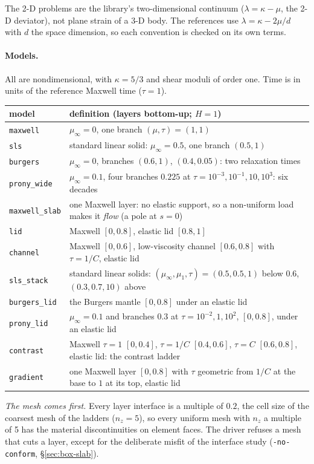 \documentclass[11pt]{article}
\numberwithin{equation}{section}
\newcommand{\code}[1]{\texttt{#1}}
\begin{document}
The 2-D problems are the library's two-dimensional continuum
($\lambda=\kappa-\mu$, the 2-D deviator), not plane strain of a 3-D body.
The references use $\lambda=\kappa-2\mu/d$ with $d$ the space dimension,
so each convention is checked on its own terms.

\paragraph{Models.}
All are nondimensional, with $\kappa=5/3$ and shear moduli of order one.
Time is in units of the reference Maxwell time ($\tau=1$).
\begin{center}
\small
\begin{tabular}{@{}lP{11.6cm}@{}}
\toprule
model & definition (layers bottom-up; $H=1$) \\
\midrule
\code{maxwell} & $\mu_\infty=0$, one branch $(\mu,\tau)=(1,1)$ \\
\code{sls} & standard linear solid: $\mu_\infty=0.5$, one branch $(0.5,1)$ \\
\code{burgers} & $\mu_\infty=0$, branches $(0.6,1)$, $(0.4,0.05)$: two relaxation times \\
\code{prony\_wide} & $\mu_\infty=0.1$, four branches $0.225$ at $\tau=10^{-3},10^{-1},10,10^3$: six decades \\
\midrule
\code{maxwell\_slab} & one Maxwell layer: no elastic support, so a non-uniform load makes it \emph{flow} (a pole at $s=0$) \\
\code{lid} & Maxwell $[0,0.8]$, elastic lid $[0.8,1]$ \\
\code{channel} & Maxwell $[0,0.6]$, low-viscosity channel $[0.6,0.8]$ with $\tau=1/C$, elastic lid \\
\code{sls\_stack} & standard linear solids: $(\mu_\infty,\mu_1,\tau)=(0.5,0.5,1)$ below $0.6$, $(0.3,0.7,10)$ above \\
\code{burgers\_lid} & the Burgers mantle $[0,0.8]$ under an elastic lid \\
\code{prony\_lid} & $\mu_\infty=0.1$ and branches $0.3$ at $\tau=10^{-2},1,10^2$, $[0,0.8]$, under an elastic lid \\
\code{contrast} & Maxwell $\tau=1$ $[0,0.4]$, $\tau=1/C$ $[0.4,0.6]$, $\tau=C$ $[0.6,0.8]$, elastic lid: the contrast ladder \\
\code{gradient} & one Maxwell layer $[0,0.8]$ with $\tau$ geometric from $1/C$ at the base to $1$ at its top, elastic lid \\
\bottomrule
\end{tabular}
\end{center}
\emph{The mesh comes first.} Every layer interface is a multiple of
$0.2$, the cell size of the coarsest mesh of the ladders ($n_z=5$), so
every uniform mesh with $n_z$ a multiple of 5 has the material
discontinuities on element faces. The driver refuses a mesh that cuts a
layer, except for the deliberate misfit of the interface study
(\code{-no-conform}, \S\ref{sec:box-slab}).
\end{document}
